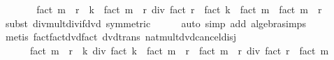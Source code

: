 \begin{isabellebody}
\ \ \isamarkupfalse%
\ \isamarkupfalse%
\ {\isachardoublequoteopen}{\isasymdots}\ {\isacharequal}{\kern0pt}\ {\isacharparenleft}{\kern0pt}fact\ {\isacharparenleft}{\kern0pt}m\ {\isacharplus}{\kern0pt}\ r\ {\isacharplus}{\kern0pt}\ k{\isacharparenright}{\kern0pt}\ {\isacharasterisk}{\kern0pt}\ fact\ {\isacharparenleft}{\kern0pt}m\ {\isacharplus}{\kern0pt}\ r{\isacharparenright}{\kern0pt}{\isacharparenright}{\kern0pt}\ div\ {\isacharparenleft}{\kern0pt}fact\ r\ {\isacharasterisk}{\kern0pt}\ {\isacharparenleft}{\kern0pt}fact\ k\ {\isacharasterisk}{\kern0pt}\ fact\ m{\isacharparenright}{\kern0pt}\ {\isacharasterisk}{\kern0pt}\ fact\ {\isacharparenleft}{\kern0pt}m\ {\isacharplus}{\kern0pt}\ r{\isacharparenright}{\kern0pt}{\isacharparenright}{\kern0pt}{\isachardoublequoteclose}\isanewline
\ \ \ \ \isamarkupfalse%
\ {\isacharparenleft}{\kern0pt}subst\ div{\isacharunderscore}{\kern0pt}mult{\isacharunderscore}{\kern0pt}div{\isacharunderscore}{\kern0pt}if{\isacharunderscore}{\kern0pt}dvd\ {\isacharbrackleft}{\kern0pt}symmetric{\isacharbrackright}{\kern0pt}{\isacharparenright}{\kern0pt}\isanewline
\ \ \ \ \isamarkupfalse%
\ {\isacharparenleft}{\kern0pt}auto\ simp\ add{\isacharcolon}{\kern0pt}\ algebra{\isacharunderscore}{\kern0pt}simps{\isacharparenright}{\kern0pt}\isanewline
\ \ \ \ \isamarkupfalse%
\ {\isacharparenleft}{\kern0pt}metis\ fact{\isacharunderscore}{\kern0pt}fact{\isacharunderscore}{\kern0pt}dvd{\isacharunderscore}{\kern0pt}fact\ dvd{\isacharunderscore}{\kern0pt}trans\ nat{\isacharunderscore}{\kern0pt}mult{\isacharunderscore}{\kern0pt}dvd{\isacharunderscore}{\kern0pt}cancel{\isacharunderscore}{\kern0pt}disj{\isacharparenright}{\kern0pt}\isanewline
\ \ \ \ \isamarkupfalse%
\isanewline
\ \ \isamarkupfalse%
\ \isamarkupfalse%
\ {\isachardoublequoteopen}{\isasymdots}\ {\isacharequal}{\kern0pt}\isanewline
\ \ \ \ \ \ {\isacharparenleft}{\kern0pt}fact\ {\isacharparenleft}{\kern0pt}m\ {\isacharplus}{\kern0pt}\ r\ {\isacharplus}{\kern0pt}\ k{\isacharparenright}{\kern0pt}\ div\ {\isacharparenleft}{\kern0pt}fact\ k\ {\isacharasterisk}{\kern0pt}\ fact\ {\isacharparenleft}{\kern0pt}m\ {\isacharplus}{\kern0pt}\ r{\isacharparenright}{\kern0pt}{\isacharparenright}{\kern0pt}\ {\isacharasterisk}{\kern0pt}\ {\isacharparenleft}{\kern0pt}fact\ {\isacharparenleft}{\kern0pt}m\ {\isacharplus}{\kern0pt}\ r{\isacharparenright}{\kern0pt}\ div\ {\isacharparenleft}{\kern0pt}fact\ r\ {\isacharasterisk}{\kern0pt}\ fact\ m{\isacharparenright}{\kern0pt}{\isacharparenright}{\kern0pt}{\isacharparenright}{\kern0pt}{\isachardoublequoteclose}\isanewline

\end{isabellebody}
